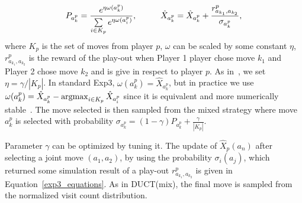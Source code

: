 \documentclass{article}
\newcommand{\argmax}{\operatornamewithlimits{argmax}}
\begin{document}
\begin{equation}\label{exp3_equations}
P_{a^{p}_{k}}=\frac{e^{\eta\omega(a^{p}_{k})}}{\sum\limits_{i \in K_{p}}e^{\eta\omega(a^{p}_{i})}}, 
\mbox{\hspace{1cm}}
\hat{X}_{a^{p}_{k}} = \hat{X}_{a^{p}_{k}} + \frac{r^{p}_{a_{k_{1}},a_{k_{2}}}}{\sigma_{a^{p}_{k}}},
\end{equation}
where $K_{p}$ is the set of moves from player $p$, $\omega$ can be scaled by some constant $\eta$, $r^{p}_{a_{k_{1}},a_{k_{2}}}$ is the reward of the play-out when Player 1 player chose move $k_{1}$ and Player 2 chose move $k_{2}$ and is give in respect to player $p$.
As in~\cite{mcts_goofspiel}, we set $\eta = \gamma / |K_p|$. 
In standard Exp3, $\omega(a^p_k) = \hat{X}_{a^p_k}$, but in practice we use $\omega(a^{p}_{k} ) = \hat{X}_{a^{p}_{k}} - \argmax_{i \in K_{p}}\hat{X}_{a^{p}_{i}}$ since it is equivalent and more numerically stable~\cite{mcts_goofspiel}.
The move selected is then sampled from the mixed strategy where move $a^p_k$ is selected with probability $\sigma_{a^{p}_{k}} = (1 - \gamma)  P_{a^{p}_{k}} + \frac{\gamma}{|K_{p}|}$.




Parameter $\gamma$ can be optimized by tuning it. The update of $\hat{X}_{p}(a_{n})$ after selecting a joint move $(a_{1},a_{2})$, by using the probability $\sigma_{i}(a_{j})$, which returned some simulation result of a play-out $r^{p}_{a_{k_{1}},a_{k_{2}}}$ is given in Equation~\ref{exp3_equations}.
As in DUCT(mix), the final move is sampled from the normalized visit count distribution.
\end{document}
